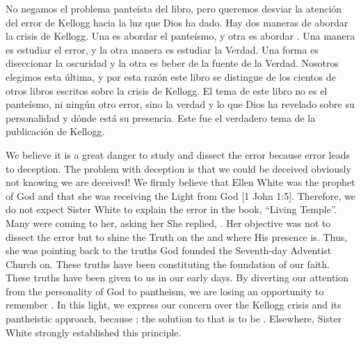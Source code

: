 No negamos el problema panteísta del libro, pero queremos desviar la atención del error de Kellogg hacia la luz que Dios ha dado. Hay dos maneras de abordar la crisis de Kellogg. Una es abordar el panteísmo, y otra es abordar . Una manera es estudiar el error, y la otra manera es estudiar la Verdad. Una forma es diseccionar la oscuridad y la otra es beber de la fuente de la Verdad. Nosotros elegimos esta última, y por esta razón este libro se distingue de los cientos de otros libros escritos sobre la crisis de Kellogg. El tema de este libro no es el panteísmo, ni ningún otro error, sino la verdad y lo que Dios ha revelado sobre su personalidad y dónde está su presencia. Este fue el verdadero tema de la publicación de Kellogg.


We believe it is a great danger to study and dissect the error because error leads to deception. The problem with deception is that we could be deceived obviously not knowing we are deceived! We firmly believe that Ellen White was the prophet of God and that she was receiving the Light from God [1 John 1:5]. Therefore, we do not expect Sister White to explain the error in the book, “Living Temple”. Many were coming to her, asking her  She replied, . Her objective was not to dissect the error but to shine the Truth on the  and where His presence is. Thus, she was pointing back to the truths God founded the Seventh-day Adventist Church on. These truths have been constituting the foundation of our faith. These truths have been given to us in our early days. By diverting our attention from the personality of God to pantheism, we are losing an opportunity to remember . In this light, we express our concern over the Kellogg crisis and its pantheistic approach, because ; the solution to that is to be . Elsewhere, Sister White strongly established this principle.



